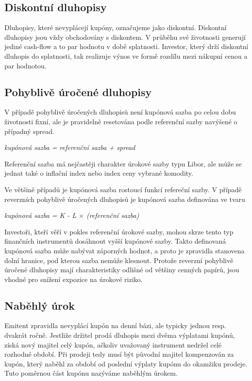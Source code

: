 \documentclass[a4paper]{book}
\begin{document}
\subsection{Diskontní dluhopisy}

Dluhopisy, které nevyplácejí kupóny, označujeme jako diskontní. Diskontní dluhopisy jsou vždy obchodovány s diskontem. V průběhu své životnosti generují jediné cash-flow a to par hodnotu v době splatnosti. Investor, který drží diskontní dluhopis do splatnosti, tak realizuje výnos ve formě rozdílu mezi nákupní cenou a par hodnotou.

\subsection{Pohyblivě úročené dluhopisy}

V případě pohyblivě úročených dluhopisů není kupónová sazba po celou dobu životnosti fixní, ale je pravidelně resetována podle referenční sazby navýšené o případný spread.
\begin{center}
\textit{kupónová sazba = referenční sazba + spread}
\end{center}
Referenční sazba má nejčastěji charakter úrokové sazby typu Libor, ale může se jednat také o inflační index nebo index ceny vybrané komodity.

Ve většině případů je kupónová sazba rostoucí funkcí refereční sazby. V případě reverzních pohyblivě úročených dluhopisů je kupónová sazba definována ve tvaru
\begin{center}
\textit{kupónová sazba = K - L $\times$ (referenční sazba)}
\end{center}
Investoři, kteří věří v pokles referenční úrokové sazby, mohou skrze tento typ finančních instrumentů dosáhnout vyšší kupónové sazby. Takto definovaná kupónová sazba může nabývat záporných hodnot, a proto je zpravidla stanovena dolní hranice, pod kterou sazba nemůže klesnout. Protože reverzní pohyblivě úročené dluhopisy mají charakteristiky odlišné od většiny cenných papírů, jsou vhodné pro snížení expozice na úrokové riziko.

\subsection{Naběhlý úrok}

Emitent zpravidla nevyplácí kupón na denní bázi, ale typicky jednou resp. dvakrát ročně. Jestliže držitel prodá dluhopis mezi dvěma výplatami kupónů, získá nový majitel celý kupón, ačkoliv uvažovaný instrument nedržel celé rozhodné období. Při prodeji tedy musí být původní majitel kompenzován za kupón, který naběhl za období od poslední výplaty kupónu do okamžiku prodeje. Tuto poměrnou část kupónu nazýváme naběhlým úrokem.
\end{document}
